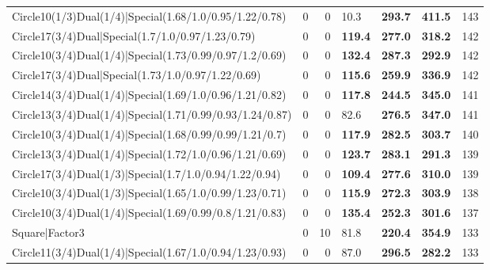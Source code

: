 \begin{tabular}{lrrlllr}
 Circle10(1/3)Dual(1/4)|Special(1.68/1.0/0.95/1.22/0.78)      &          0   &            0   & 10.3           & \textbf{293.7} & \textbf{411.5} &          143 \\
 Circle17(3/4)Dual|Special(1.7/1.0/0.97/1.23/0.79)            &          0   &            0   & \textbf{119.4} & \textbf{277.0} & \textbf{318.2} &          142 \\
 Circle10(3/4)Dual(1/4)|Special(1.73/0.99/0.97/1.2/0.69)      &          0   &            0   & \textbf{132.4} & \textbf{287.3} & \textbf{292.9} &          142 \\
 Circle17(3/4)Dual|Special(1.73/1.0/0.97/1.22/0.69)           &          0   &            0   & \textbf{115.6} & \textbf{259.9} & \textbf{336.9} &          142 \\
 Circle14(3/4)Dual(1/4)|Special(1.69/1.0/0.96/1.21/0.82)      &          0   &            0   & \textbf{117.8} & \textbf{244.5} & \textbf{345.0} &          141 \\
 Circle13(3/4)Dual(1/4)|Special(1.71/0.99/0.93/1.24/0.87)     &          0   &            0   & 82.6           & \textbf{276.5} & \textbf{347.0} &          141 \\
 Circle10(3/4)Dual(1/4)|Special(1.68/0.99/0.99/1.21/0.7)      &          0   &            0   & \textbf{117.9} & \textbf{282.5} & \textbf{303.7} &          140 \\
 Circle13(3/4)Dual(1/4)|Special(1.72/1.0/0.96/1.21/0.69)      &          0   &            0   & \textbf{123.7} & \textbf{283.1} & \textbf{291.3} &          139 \\
 Circle17(3/4)Dual(1/3)|Special(1.7/1.0/0.94/1.22/0.94)       &          0   &            0   & \textbf{109.4} & \textbf{277.6} & \textbf{310.0} &          139 \\
 Circle10(3/4)Dual(1/3)|Special(1.65/1.0/0.99/1.23/0.71)      &          0   &            0   & \textbf{115.9} & \textbf{272.3} & \textbf{303.9} &          138 \\
 Circle10(3/4)Dual(1/4)|Special(1.69/0.99/0.8/1.21/0.83)      &          0   &            0   & \textbf{135.4} & \textbf{252.3} & \textbf{301.6} &          137 \\
 Square|Factor3                                               &          0   &           10   & 81.8           & \textbf{220.4} & \textbf{354.9} &          133 \\
 Circle11(3/4)Dual(1/4)|Special(1.67/1.0/0.94/1.23/0.93)      &          0   &            0   & 87.0           & \textbf{296.5} & \textbf{282.2} &          133 \\

\end{tabular}
